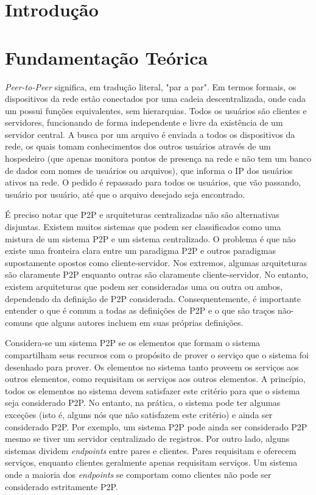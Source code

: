 \documentclass[a4paper]{article}
\begin{document}
\tableofcontents
\newpage
{}

\section{Introdução}
\newpage

\section{Fundamentação Teórica}
\textit{Peer-to-Peer} significa, em tradução literal, "par a par". Em termos formais, os dispositivos da rede estão conectados por uma cadeia descentralizada, onde cada um possui funções equivalentes, sem hierarquias. Todos os usuários são clientes e servidores, funcionando de forma independente e livre da existência de um servidor central. A busca por um arquivo é enviada a todos os dispositivos da rede, os quais tomam conhecimentos dos outros usuários através de um hospedeiro (que apenas monitora pontos de presença na rede e não tem um banco de dados com nomes de usuários ou arquivos), que informa o IP dos usuários ativos na rede. O pedido é repassado para todos os usuários, que vão passando, usuário por usuário, até que o arquivo desejado seja encontrado.\cite{sisp2p}

É preciso notar que P2P e arquiteturas centralizadas não são alternativas disjuntas. Existem muitos sistemas que podem ser classificados como uma mistura de um sistema P2P e um sistema centralizado. O problema é que não existe uma fronteira clara entre um paradigma P2P e outros paradigmas supostamente opostos como cliente-servidor. Nos extremos, algumas arquiteturas são claramente P2P enquanto outras são claramente cliente-servidor. No entanto, existem arquiteturas que podem ser consideradas uma ou outra ou ambos, dependendo da definição de P2P considerada. Consequentemente, é importante entender o que é comum a todas as definições de P2P e o que são traços não-comuns que alguns autores incluem em suas próprias definições.\cite{camarillop2parch}

Considera-se um sistema P2P se os elementos que formam o sistema compartilham seus recursos com o propósito de prover o serviço que o sistema foi desenhado para prover. Os elementos no sistema tanto proveem os serviços aos outros elementos, como requisitam os serviços aos outros elementos. A princípio, todos os elementos no sistema devem satisfazer este critério para que o sistema seja considerado P2P. No entanto, na prática, o sistema pode ter algumas exceções (isto é, alguns nós que não satisfazem este critério) e ainda ser considerado P2P. Por exemplo, um sistema P2P pode ainda ser considerado P2P mesmo se tiver um servidor centralizado de registros. Por outro lado, alguns sistemas dividem \textit{endpoints} entre pares e clientes. Pares requisitam e oferecem serviços, enquanto clientes geralmente apenas requisitam serviços. Um sistema onde a maioria dos \textit{endpoints} se comportam como clientes não pode ser considerado estritamente P2P. \cite{camarillop2parch}
\end{document}
